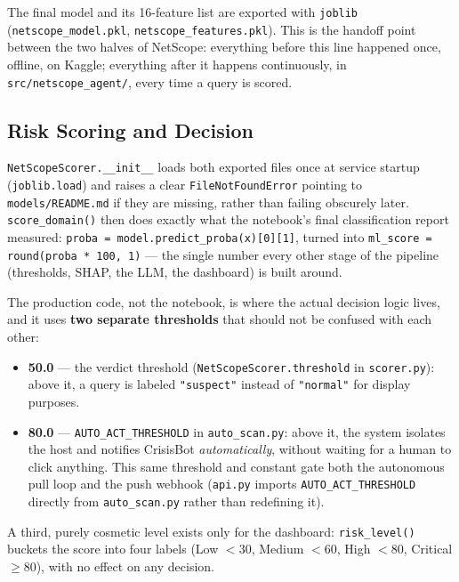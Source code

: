 The final model and its 16-feature list are exported with \texttt{joblib}
(\texttt{netscope\_model.pkl}, \texttt{netscope\_features.pkl}). This is the
handoff point between the two halves of NetScope: everything before this
line happened once, offline, on Kaggle; everything after it happens
continuously, in \texttt{src/netscope\_agent/}, every time a query is
scored.

\subsection*{Risk Scoring and Decision}
\texttt{NetScopeScorer.\_\_init\_\_} loads both exported files once at
service startup (\texttt{joblib.load}) and raises a clear
\texttt{FileNotFoundError} pointing to \texttt{models/README.md} if they are
missing, rather than failing obscurely later. \texttt{score\_domain()} then
does exactly what the notebook's final classification report measured:
\texttt{proba = model.predict\_proba(x)[0][1]}, turned into
\texttt{ml\_score = round(proba * 100, 1)} --- the single number every
other stage of the pipeline (thresholds, SHAP, the LLM, the dashboard) is
built around.

The production code, not the notebook, is where the actual decision logic
lives, and it uses \textbf{two separate thresholds} that should not be
confused with each other:

\begin{itemize}[nosep]
\item \textbf{50.0} --- the verdict threshold (\texttt{NetScopeScorer.threshold} in \texttt{scorer.py}): above it, a query is labeled \texttt{"suspect"} instead of \texttt{"normal"} for display purposes.
\item \textbf{80.0} --- \texttt{AUTO\_ACT\_THRESHOLD} in \texttt{auto\_scan.py}: above it, the system isolates the host and notifies CrisisBot \emph{automatically}, without waiting for a human to click anything. This same threshold and constant gate both the autonomous pull loop and the push webhook (\texttt{api.py} imports \texttt{AUTO\_ACT\_THRESHOLD} directly from \texttt{auto\_scan.py} rather than redefining it).
\end{itemize}

A third, purely cosmetic level exists only for the dashboard:
\texttt{risk\_level()} buckets the score into four labels (Low $<$30, Medium
$<$60, High $<$80, Critical $\geq$80), with no effect on any decision.

